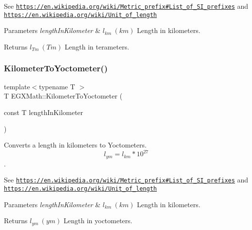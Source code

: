 See \href{https://en.wikipedia.org/wiki/Metric_prefix#List_of_SI_prefixes}{\tt https\+://en.\+wikipedia.\+org/wiki/\+Metric\+\_\+prefix\#\+List\+\_\+of\+\_\+\+S\+I\+\_\+prefixes} and \href{https://en.wikipedia.org/wiki/Unit_of_length}{\tt https\+://en.\+wikipedia.\+org/wiki/\+Unit\+\_\+of\+\_\+length} 
\begin{DoxyParams}{Parameters}
{\em length\+In\+Kilometer} & $ l_{km}\ (km)$ Length in kilometers. \\
\hline
\end{DoxyParams}
\begin{DoxyReturn}{Returns}
$ l_{Tm}\ (Tm)$ Length in terameters. 
\end{DoxyReturn}
\mbox{\label{group___e_g_x_math-_conversions-_length_conversions-_kilometer-_s_i_gaf03c100edda155de40290d8c3e155a27}} 
\subsubsection{\texorpdfstring{Kilometer\+To\+Yoctometer()}{KilometerToYoctometer()}}
{\footnotesize\ttfamily template$<$typename T $>$ \\
T E\+G\+X\+Math\+::\+Kilometer\+To\+Yoctometer (\begin{DoxyParamCaption}\item[{const T}]{length\+In\+Kilometer }\end{DoxyParamCaption})}



Converts a length in kilometers to Yoctometers. \[ l_{ym}=l_{km} * 10^{27} \]. 

See \href{https://en.wikipedia.org/wiki/Metric_prefix#List_of_SI_prefixes}{\tt https\+://en.\+wikipedia.\+org/wiki/\+Metric\+\_\+prefix\#\+List\+\_\+of\+\_\+\+S\+I\+\_\+prefixes} and \href{https://en.wikipedia.org/wiki/Unit_of_length}{\tt https\+://en.\+wikipedia.\+org/wiki/\+Unit\+\_\+of\+\_\+length} 
\begin{DoxyParams}{Parameters}
{\em length\+In\+Kilometer} & $ l_{km}\ (km)$ Length in kilometers. \\
\hline
\end{DoxyParams}
\begin{DoxyReturn}{Returns}
$ l_{ym}\ (ym)$ Length in yoctometers. 
\end{DoxyReturn}
\mbox{\label{group___e_g_x_math-_conversions-_length_conversions-_kilometer-_s_i_gaf29070fac412b7a92466866b2ae32337}} 
